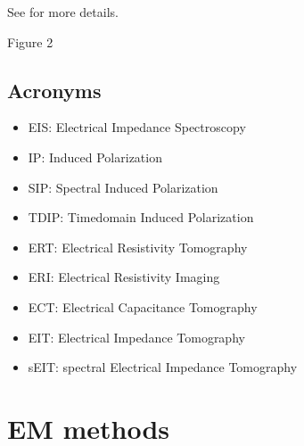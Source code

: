 \documentclass[letterpaper,10pt,english]{sphinxmanual}
\begin{document}
\begin{figure}[htbp]
\centering

\noindent{}
\end{figure}

\sphinxAtStartPar
See  for more details.

\sphinxAtStartPar
Figure 2


\subsection{Acronyms}
\label{\detokenize{glossary:acronyms}}
\sphinxAtStartPar
{}
\begin{itemize}
\item {} 
\sphinxAtStartPar
EIS: Electrical Impedance Spectroscopy

\item {} 
\sphinxAtStartPar
IP: Induced Polarization

\item {} 
\sphinxAtStartPar
SIP: Spectral Induced Polarization

\item {} 
\sphinxAtStartPar
TDIP: Time\sphinxhyphen{}domain Induced Polarization

\end{itemize}

\sphinxAtStartPar
{}
\begin{itemize}
\item {} 
\sphinxAtStartPar
ERT: Electrical Resistivity Tomography

\item {} 
\sphinxAtStartPar
ERI: Electrical Resistivity Imaging

\item {} 
\sphinxAtStartPar
ECT: Electrical Capacitance Tomography

\item {} 
\sphinxAtStartPar
EIT: Electrical Impedance Tomography

\item {} 
\sphinxAtStartPar
sEIT: spectral Electrical Impedance Tomography

\end{itemize}


\section{EM methods}
\label{\detokenize{glossary:em-methods}}
\end{document}
